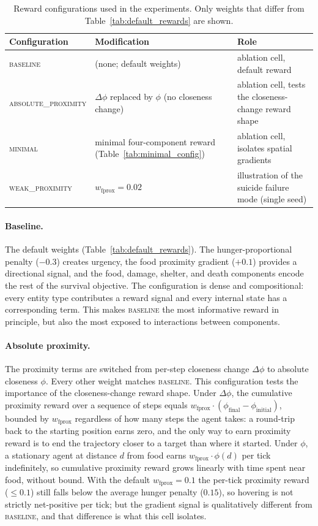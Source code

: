 \documentclass[12pt,a4paper,titlepage]{article}
\begin{document}
\begin{table}[!ht]
\centering
\caption{Reward configurations used in the experiments. Only weights that differ from Table~\ref{tab:default_rewards} are shown.}
\label{tab:reward_configs}
\small
\begin{tabular}{lll}
\toprule
Configuration & Modification & Role \\
\midrule
\textsc{baseline}            & (none; default weights)                        & ablation cell, default reward \\
\textsc{absolute\_proximity} & $\Delta\phi$ replaced by $\phi$ (no closeness change) & ablation cell, tests the closeness-change reward shape \\
\textsc{minimal}      & minimal four-component reward (Table~\ref{tab:minimal_config}) & ablation cell, isolates spatial gradients \\
\textsc{weak\_proximity}     & $w_\text{fprox} = 0.02$                           & illustration of the suicide failure mode (single seed) \\
\bottomrule
\end{tabular}
\end{table}

\paragraph{Baseline.} The default weights (Table~\ref{tab:default_rewards}). The hunger-proportional penalty ($-0.3$) creates urgency, the food proximity gradient ($+0.1$) provides a directional signal, and the food, damage, shelter, and death components encode the rest of the survival objective. The configuration is dense and compositional: every entity type contributes a reward signal and every internal state has a corresponding term. This makes \textsc{baseline} the most informative reward in principle, but also the most exposed to interactions between components.

\paragraph{Absolute proximity.} The proximity terms are switched from per-step closeness change $\Delta\phi$ to absolute closeness $\phi$. Every other weight matches \textsc{baseline}. This configuration tests the importance of the closeness-change reward shape. Under $\Delta\phi$, the cumulative proximity reward over a sequence of steps equals $w_\text{fprox} \cdot (\phi_\text{final} - \phi_\text{initial})$, bounded by $w_\text{fprox}$ regardless of how many steps the agent takes: a round-trip back to the starting position earns zero, and the only way to earn proximity reward is to end the trajectory closer to a target than where it started. Under $\phi$, a stationary agent at distance $d$ from food earns $w_\text{fprox} \cdot \phi(d)$ per tick indefinitely, so cumulative proximity reward grows linearly with time spent near food, without bound. With the default $w_\text{fprox} = 0.1$ the per-tick proximity reward ($\leq 0.1$) still falls below the average hunger penalty ($0.15$), so hovering is not strictly net-positive per tick; but the gradient signal is qualitatively different from \textsc{baseline}, and that difference is what this cell isolates.
\end{document}
